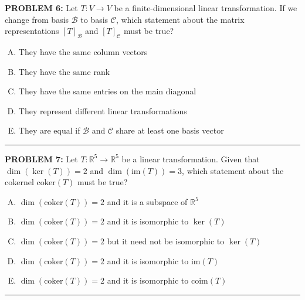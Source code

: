 \documentclass[12pt]{amsart}
\newcommand{\divider}{
  \vspace{-1em} %
  \noindent
  \raisebox{-0.15ex}{\textbullet}%
  \hspace{0.5em}%
  \rule[0.5ex]{0.95\textwidth}{1.0pt}%
  \hspace{0.5em}%
  \raisebox{-0.15ex}{\textbullet}%
  \vspace{0em} %
}
\begin{document}
{\bf PROBLEM 6:}
Let $T: V \to V$ be a finite-dimensional linear transformation. If we change from basis $\mathcal{B}$ to basis $\mathcal{C}$, which statement about the matrix representations $[T]_{\mathcal{B}}$ and $[T]_{\mathcal{C}}$ must be true?
%
\begin{enumerate}[(A)]
\item They have the same column vectors
\item They have the same rank
\item They have the same entries on the main diagonal
\item They represent different linear transformations
\item They are equal if $\mathcal{B}$ and $\mathcal{C}$ share at least one basis vector
\end{enumerate}
%
%
\divider


{\bf PROBLEM 7:}
Let $T: \mathbb{R}^5 \to \mathbb{R}^5$ be a linear transformation. 
Given that $\dim(\ker(T)) = 2$ and $\dim(\text{im}(T)) = 3$, which statement about the cokernel $\text{coker}(T)$ must be true?
%
\begin{enumerate}[(A)]
\item $\dim(\text{coker}(T)) = 2$ and it is a subspace of $\mathbb{R}^5$
\item $\dim(\text{coker}(T)) = 2$ and it is isomorphic to $\ker(T)$
\item $\dim(\text{coker}(T)) = 2$ but it need not be isomorphic to $\ker(T)$
\item $\dim(\text{coker}(T)) = 2$ and it is isomorphic to $\text{im}(T)$
\item $\dim(\text{coker}(T)) = 2$ and it is isomorphic to $\text{coim}(T)$
\end{enumerate}
%
%
\divider
\end{document}
